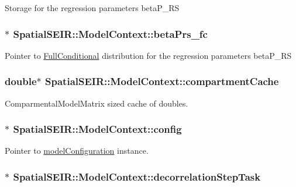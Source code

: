 Storage for the regression parameters beta\-P\-\_\-\-R\-S \hypertarget{classSpatialSEIR_1_1ModelContext_a9eb52c439f5b00fe5926297f45484bd3}{
\subsubsection[{beta\-Prs\-\_\-fc}]{$\ast$ Spatial\-S\-E\-I\-R\-::\-Model\-Context\-::beta\-Prs\-\_\-fc}}\label{classSpatialSEIR_1_1ModelContext_a9eb52c439f5b00fe5926297f45484bd3}
Pointer to \hyperlink{classSpatialSEIR_1_1FullConditional}{Full\-Conditional} distribution for the regression parameters beta\-P\-\_\-\-R\-S \hypertarget{classSpatialSEIR_1_1ModelContext_a7146f9527fc298a50828757e477a33d3}{
\subsubsection[{compartment\-Cache}]{\setlength{\rightskip}{0pt plus 5cm}double$\ast$ Spatial\-S\-E\-I\-R\-::\-Model\-Context\-::compartment\-Cache}}\label{classSpatialSEIR_1_1ModelContext_a7146f9527fc298a50828757e477a33d3}
Comparmental\-Model\-Matrix sized cache of doubles. \hypertarget{classSpatialSEIR_1_1ModelContext_a7c8c2708dabbc0a32bf32252942b3a12}{
\subsubsection[{config}]{$\ast$ Spatial\-S\-E\-I\-R\-::\-Model\-Context\-::config}}\label{classSpatialSEIR_1_1ModelContext_a7c8c2708dabbc0a32bf32252942b3a12}
Pointer to \hyperlink{structSpatialSEIR_1_1modelConfiguration}{model\-Configuration} instance. \hypertarget{classSpatialSEIR_1_1ModelContext_a0b5cd5089cd6b9ebf3034387406dccb2}{
\subsubsection[{decorrelation\-Step\-Task}]{$\ast$ Spatial\-S\-E\-I\-R\-::\-Model\-Context\-::decorrelation\-Step\-Task}}\label{classSpatialSEIR_1_1ModelContext_a0b5cd5089cd6b9ebf3034387406dccb2}
